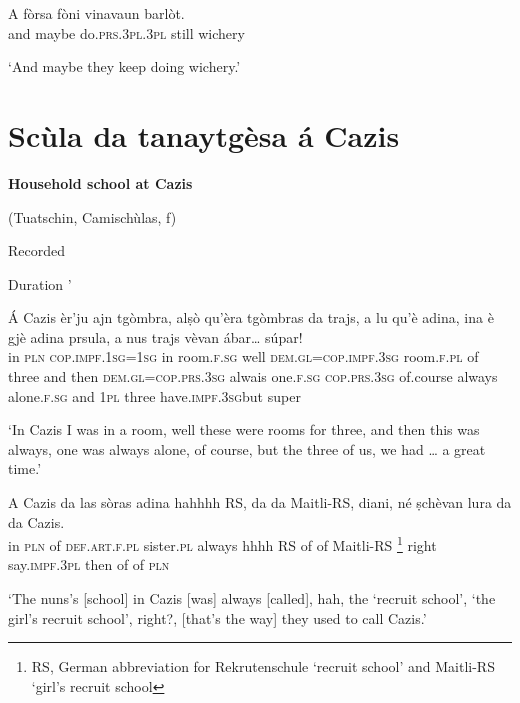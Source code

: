 \begin{linenumbers} 
\gll    A fòrsa fòni vinavaun barlòt. \\
and maybe do.\textsc{prs.3pl.3pl} still wichery\\
\end{linenumbers}
\medskip
\glt `And maybe they keep doing wichery.'
\medskip

\section{Scùla da tanaytgèsa á Cazis}


\textbf{Household school at Cazis}

\noindent
(Tuatschin, Camischùlas, f)

\noindent
Recorded

\noindent
Duration '
\bigskip

\begin{linenumbers}
\gll    Á Cazis èr’ju ajn tgòmbra, alṣò qu’èra tgòmbras da trajs, a lu qu’è adina, ina è gjè adina prsula, a nus trajs vèvan ábar… súpar!\\
in \textsc{pln} \textsc{cop.impf.1sg=1sg} in room.\textsc{f.sg} well \textsc{dem.gl=cop.impf.3sg} room.\textsc{f.pl} of three and then \textsc{dem.gl=cop.prs.3sg} alwais  one.\textsc{f.sg} \textsc{cop.prs.3sg} of.course always alone.\textsc{f.sg} and \textsc{1pl} three have.\textsc{impf.3sg}but super\\
\end{linenumbers}
\medskip
\glt `In Cazis I was in a room, well these were rooms for three, and then this was always, one was always alone, of course, but the three of us, we had … a great time.'
\medskip

\begin{linenumbers}
\gll    A Cazis da las sòras adina hahhhh RS, da da Maitli-RS, diani, né ṣchèvan lura da da Cazis.\\
in \textsc{pln} of \textsc{def.art.f.pl} sister.\textsc{pl} always hhhh RS of of Maitli-RS \footnote{RS, German abbreviation for Rekrutenschule ‘recruit school’ and Maitli-RS ‘girl’s recruit school} right say.\textsc{impf.3pl} then of of \textsc{pln}\\
\end{linenumbers}
\medskip
\glt `The nuns’s [school] in  Cazis [was] always [called], hah, the ‘recruit school’, ‘the girl’s recruit school’, right?, [that’s the way] they used to call Cazis.'
\medskip

